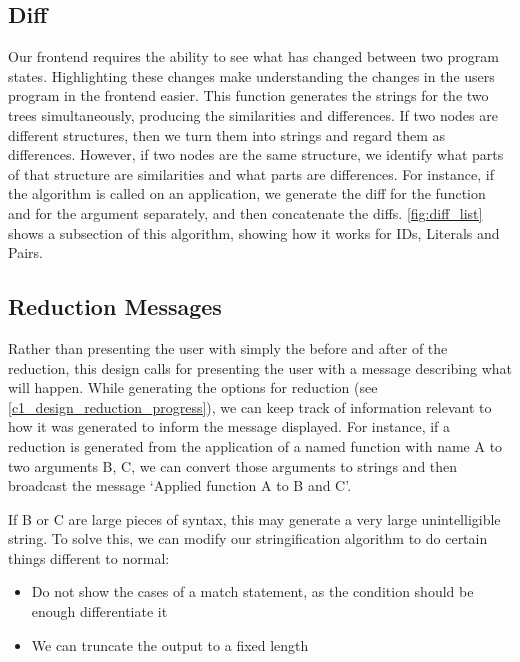 \subsection{Diff}
\label{paragraph:diff} 
Our frontend requires the ability to see what has changed between two program states. Highlighting these changes make understanding the changes in the users program in the frontend easier. This function generates the strings for the two trees simultaneously, producing the similarities and differences. If two nodes are different structures, then we turn them into strings and regard them as differences. However, if two nodes are the same structure, we identify what parts of that structure are similarities and what parts are differences. For instance, if the algorithm is called on an application, we generate the diff for the function and for the argument separately, and then concatenate the diffs. \ref{fig:diff_list} shows a subsection of this algorithm, showing how it works for IDs, Literals and Pairs. 


\subsection{Reduction Messages}
Rather than presenting the user with simply the before and after of the reduction, this design calls for presenting the user with a message describing what will happen. While generating the options for reduction (see \ref{c1_design_reduction_progress}), we can keep track of information relevant to how it was generated to inform the message displayed. For instance, if a reduction is generated from the application of a named function with name A to two arguments B, C, we can convert those arguments to strings and then broadcast the message `Applied function A to B and C'. 

If B or C are large pieces of syntax, this may generate a very large unintelligible string. To solve this, we can modify our stringification algorithm to do certain things different to normal:
\begin{itemize}
    \item Do not show the cases of a match statement, as the condition should be enough differentiate it
    \item We can truncate the output to a fixed length 
\end{itemize}

